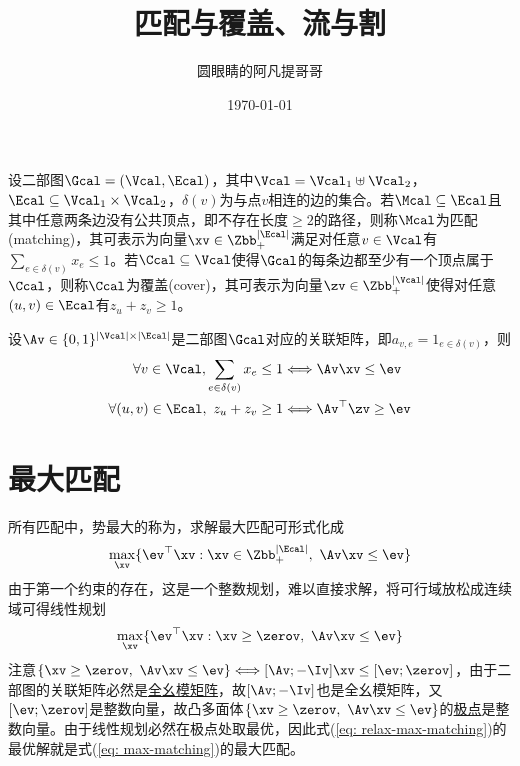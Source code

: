 \documentclass{ctexart}
\begin{document}
\title{匹配与覆盖、流与割}
\author{圆眼睛的阿凡提哥哥}
\date{\today}
\maketitle

设二部图$\Gcal = (\Vcal, \Ecal)$，其中$\Vcal = \Vcal_1 \uplus \Vcal_2$，$\Ecal \subseteq \Vcal_1 \times \Vcal_2$，$\delta(v)$为与点$v$相连的边的集合。若$\Mcal \subseteq \Ecal$且其中任意两条边没有公共顶点，即不存在长度$\ge 2$的路径，则称$\Mcal$为匹配(matching)，其可表示为向量$\xv \in \Zbb_+^{|\Ecal|}$满足对任意$v \in \Vcal$有$\sum_{e \in \delta(v)} x_e \le 1$。若$\Ccal \subseteq \Vcal$使得$\Gcal$的每条边都至少有一个顶点属于$\Ccal$，则称$\Ccal$为覆盖(cover)，其可表示为向量$\zv \in \Zbb_+^{|\Vcal|}$使得对任意$(u,v) \in \Ecal$有$z_u + z_v \ge 1$。

设$\Av \in \{ 0,1 \}^{|\Vcal| \times |\Ecal|}$是二部图$\Gcal$对应的关联矩阵，即$a_{v,e} = 1_{e \in \delta(v)}$，则
\begin{align*}
    \forall v \in \Vcal, \sum_{e \in \delta(v)} x_e \le 1 & \Longleftrightarrow \Av \xv \le \ev      \\
    \forall (u,v) \in \Ecal, ~ z_u + z_v \ge 1            & \Longleftrightarrow \Av^\top \zv \ge \ev
\end{align*}

\section{最大匹配}

所有匹配中，势最大的称为，求解最大匹配可形式化成
\begin{align} \label{eq: max-matching}
    \max_{\xv} \{ \ev^\top \xv : \xv \in \Zbb_+^{|\Ecal|}, ~ \Av \xv \le \ev \}
\end{align}
由于第一个约束的存在，这是一个整数规划，难以直接求解，将可行域放松成连续域可得线性规划
\begin{align} \label{eq: relax-max-matching}
    \max_{\xv} \{ \ev^\top \xv : \xv \ge \zerov, ~ \Av \xv \le \ev \}
\end{align}
注意$\{ \xv \ge \zerov, ~ \Av \xv \le \ev \} \Longleftrightarrow [\Av; -\Iv] \xv \le [\ev; \zerov]$，由于二部图的关联矩阵必然是\href{https://avanti1980.github.io/notes-on-math/posts/matrix/TU-matrix.html}{全幺模矩阵}，故$[\Av; -\Iv]$也是全幺模矩阵，又$[\ev; \zerov]$是整数向量，故凸多面体$\{ \xv \ge \zerov, ~ \Av \xv \le \ev \}$的\href{https://avanti1980.github.io/notes-on-math/posts/convex-optimization/extreme-point.html}{极点}是整数向量。由于线性规划必然在极点处取最优，因此式(\ref{eq: relax-max-matching})的最优解就是式(\ref{eq: max-matching})的最大匹配。
\end{document}

